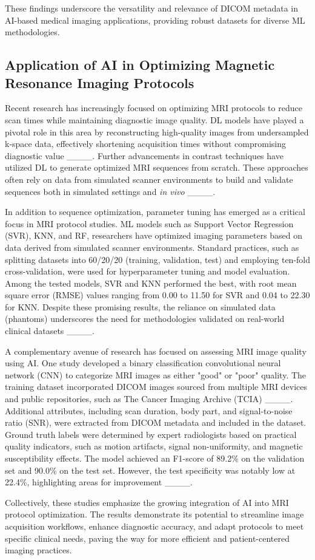These findings underscore the versatility and relevance of DICOM metadata in AI-based medical imaging applications, providing robust datasets for diverse ML methodologies.

\subsection{Application of AI in Optimizing Magnetic Resonance Imaging Protocols}
Recent research has increasingly focused on optimizing MRI protocols to reduce scan times while maintaining diagnostic image quality. DL models have played a pivotal role in this area by reconstructing high-quality images from undersampled k-space data, effectively shortening acquisition times without compromising diagnostic value ____. Further advancements in contrast techniques have utilized DL to generate optimized MRI sequences from scratch. These approaches often rely on data from simulated scanner environments to build and validate sequences both in simulated settings and \textit{in vivo} ____.

In addition to sequence optimization, parameter tuning has emerged as a critical focus in MRI protocol studies. ML models such as Support Vector Regression (SVR), KNN, and RF, researchers have optimized imaging parameters based on data derived from simulated scanner environments. Standard practices, such as splitting datasets into 60/20/20 (training, validation, test) and employing ten-fold cross-validation, were used for hyperparameter tuning and model evaluation. Among the tested models, SVR and KNN performed the best, with root mean square error (RMSE) values ranging from 0.00 to 11.50 for SVR and 0.04 to 22.30 for KNN. Despite these promising results, the reliance on simulated data (phantoms) underscores the need for methodologies validated on real-world clinical datasets ____.

A complementary avenue of research has focused on assessing MRI image quality using AI. One study developed a binary classification convolutional neural network (CNN) to categorize MRI images as either "good" or "poor" quality. The training dataset incorporated DICOM images sourced from multiple MRI devices and public repositories, such as The Cancer Imaging Archive (TCIA) ____. Additional attributes, including scan duration, body part, and signal-to-noise ratio (SNR), were extracted from DICOM metadata and included in the dataset. Ground truth labels were determined by expert radiologists based on practical quality indicators, such as motion artifacts, signal non-uniformity, and magnetic susceptibility effects. The model achieved an F1-score of 89.2\% on the validation set and 90.0\% on the test set. However, the test specificity was notably low at 22.4\%, highlighting areas for improvement ____.

Collectively, these studies emphasize the growing integration of AI into MRI protocol optimization. The results demonstrate its potential to streamline image acquisition workflows, enhance diagnostic accuracy, and adapt protocols to meet specific clinical needs, paving the way for more efficient and patient-centered imaging practices.